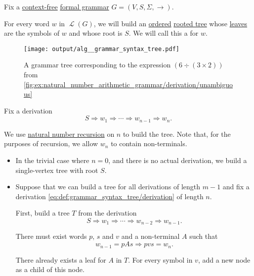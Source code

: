 \begin{definition}\label{def:grammar_syntax_tree}\mimprovised
  Fix a \hyperref[def:chomsky_hierarchy/context_free]{context-free} \hyperref[def:formal_grammar]{formal grammar} \( G = (V, S, \Sigma, \to) \).

  For every word \( w \) in \( \mscrL(G) \), we will build an \hyperref[def:ordered_arborescence]{ordered} \hyperref[def:arborescence/undirected]{rooted tree} whose \hyperref[def:arborescence/ancestry]{leaves} are the symbols of \( w \) and whose root is \( S \). We will call this a  for \( w \).

  \begin{figure}
    \hfill
    \texttt{[image: output/alg\_\_grammar\_syntax\_tree.pdf]}
    \hfill\hfill
    \caption{A grammar tree corresponding to the expression \( (6 \div (3 \times 2)) \) from \cref{fig:ex:natural_number_arithmetic_grammar/derivation/unambiguous}}
    \label{fig:def:grammar_syntax_tree}
  \end{figure}

  Fix a derivation
  \begin{equation}\label{eq:def:grammar_syntax_tree/derivation}
    S \Rightarrow w_1 \Rightarrow \cdots \Rightarrow w_{n-1} \Rightarrow w_n.
  \end{equation}

  We use \hyperref[rem:natural_number_recursion]{natural number recursion} on \( n \) to build the tree. Note that, for the purposes of recursion, we allow \( w_n \) to contain non-terminals.

  \begin{itemize}
    \item In the trivial case where \( n = 0 \), and there is no actual derivation, we build a single-vertex tree with root \( S \).

    \item Suppose that we can build a tree for all derivations of length \( m - 1 \) and fix a derivation \eqref{eq:def:grammar_syntax_tree/derivation} of length \( n \).

    First, build a tree \( T \) from the derivation
    \begin{equation*}
      S \Rightarrow w_1 \Rightarrow \cdots \Rightarrow w_{n-2} \Rightarrow w_{n-1}.
    \end{equation*}

    There must exist words \( p \), \( s \) and \( v \) and a non-terminal \( A \) such that
    \begin{equation*}
      w_{n-1} = pAs \Rightarrow pvs = w_n.
    \end{equation*}

    There already exists a leaf for \( A \) in \( T \). For every symbol in \( v \), add a new node as a child of this node.
  \end{itemize}
\end{definition}

